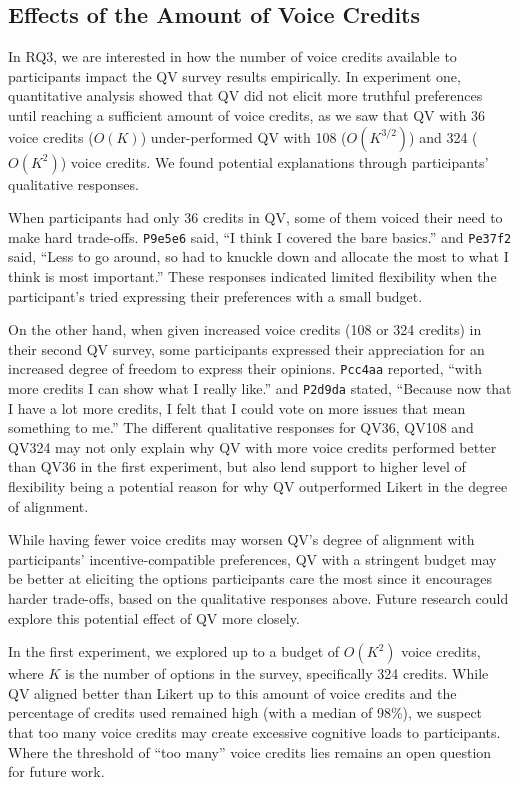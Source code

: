 \subsection{Effects of the Amount of Voice Credits}
In RQ3, we are interested in how the number of voice credits available to participants impact the QV survey results empirically. In experiment one, quantitative analysis showed that QV did not elicit more truthful preferences until reaching a sufficient amount of voice credits, as we saw that QV with 36 voice credits ($O(K)$) under-performed QV with 108 ($O(K^{3/2})$) and 324 ($O(K^{2})$) voice credits. We found potential explanations through participants' qualitative responses. 

When participants had only 36 credits in QV, some of them voiced their need to make hard trade-offs. \texttt{P9e5e6} said, ``I think I covered the bare basics.'' and \texttt{Pe37f2} said, ``Less to go around, so had to knuckle down and allocate the most to what I think is most important.'' These responses indicated limited flexibility when the participant's tried expressing their preferences with a small budget.

On the other hand, when given increased voice credits (108 or 324 credits) in their second QV survey, some participants expressed their appreciation for an increased degree of freedom to express their opinions. \texttt{Pcc4aa} reported, ``with more credits I can show what I really like.'' and \texttt{P2d9da} stated, ``Because now that I have a lot more credits, I felt that I could vote on more issues that mean something to me.'' The different qualitative responses for QV36, QV108 and QV324 may not only explain why QV with more voice credits performed better than QV36 in the first experiment, but also lend support to higher level of flexibility being a potential reason for why QV outperformed Likert in the degree of alignment. 

While having fewer voice credits may worsen QV's degree of alignment with participants' incentive-compatible preferences, QV with a stringent budget may be better at eliciting the options participants care the most since it encourages harder trade-offs, based on the qualitative responses above. Future research could explore this potential effect of QV more closely.

In the first experiment, we explored up to a budget of $O(K^{2})$ voice credits, where $K$ is the number of options in the survey, specifically 324 credits. While QV aligned better than Likert up to this amount of voice credits and the percentage of credits used remained high (with a median of 98\%), we suspect that too many voice credits may create excessive cognitive loads to participants. Where the threshold of ``too many'' voice credits lies remains an open question for future work.



